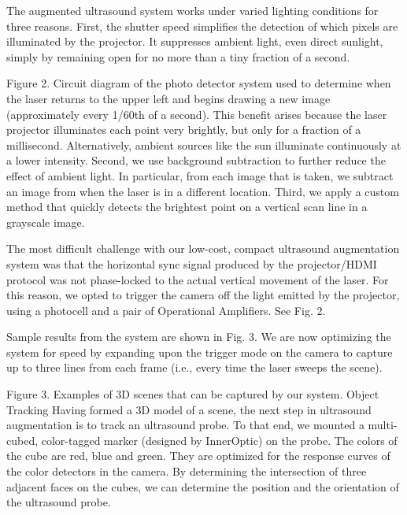\documentclass{llncs}
\begin{document}
The augmented ultrasound system works under varied lighting conditions for three reasons. First, the shutter speed simplifies the detection of which pixels are illuminated by the projector. It suppresses ambient light, even direct sunlight, simply by remaining open for no more than a tiny fraction of a second.


Figure 2. Circuit diagram of the photo detector system used to determine when the laser returns to the upper left and begins drawing a new image (approximately every 1/60th of a second).
This benefit arises because the laser projector illuminates each point very brightly, but only for a fraction of a millisecond. Alternatively, ambient sources like the sun illuminate continuously at a lower intensity. Second, we use background subtraction to further reduce the effect of ambient light. In particular, from each image that is taken, we subtract an image from when the laser is in a different location.  Third, we apply a custom method that quickly detects the brightest point on a vertical scan line in a grayscale image.

The most difficult challenge with our low-cost, compact ultrasound augmentation system was that the horizontal sync signal produced by the projector/HDMI protocol was not phase-locked to the actual vertical movement of the laser. For this reason, we opted to trigger the camera off the light emitted by the projector, using a photocell and a pair of Operational Amplifiers.  See Fig. 2.

Sample results from the system are shown in Fig. 3.  We are now optimizing the system for speed by expanding upon the trigger mode on the camera to capture up to three lines from each frame (i.e., every time the laser sweeps the scene).


Figure 3. Examples of 3D scenes that can be captured by our system.
Object Tracking
Having formed a 3D model of a scene, the next step in ultrasound augmentation is to track an ultrasound probe. To that end, we mounted a multi-cubed, color-tagged marker (designed by InnerOptic) on the probe.  The colors of the cube are red, blue and green. They are optimized for the response curves of the color detectors in the camera. By determining the intersection of three adjacent faces on the cubes, we can determine the position and the orientation of the ultrasound probe.
\end{document}
